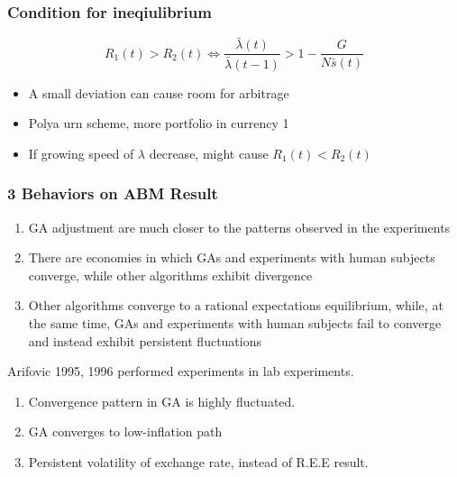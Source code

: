 \begin{frame}
    \frametitle{Condition for ineqiulibrium}

    \begin{equation*}
        R_1(t) > R_2(t) \iff \frac{\bar{\lambda}(t)}{\bar{\lambda}(t-1)} > 1 - \frac{G}{N\bar{s}(t)}
    \end{equation*}
    \begin{itemize}
        \item A small deviation can cause room for arbitrage 
        \item Polya urn scheme, more portfolio in currency 1
        \item If growing speed of $\lambda$ decrease, might cause  $R_1(t) < R_2(t)$ 
    \end{itemize}

    

\end{frame}

\begin{frame}
    \frametitle{3 Behaviors on ABM Result}

    \begin{enumerate}
        \item GA adjustment are much closer to the patterns observed in the experiments 
        \item There are economies in which GAs and experiments with human subjects converge, 
                while other algorithms exhibit divergence
        \item Other algorithms converge to a rational expectations equilibrium, while, 
            at the same time, GAs and experiments with human subjects 
            fail to converge and instead exhibit persistent fluctuations
    \end{enumerate}

    Arifovic 1995, 1996 performed experiments in lab experiments.
    

\end{frame}

\begin{frame}
    
    \begin{enumerate}
        \item Convergence pattern in GA is highly fluctuated.
        \item GA converges to low-inflation path
        \item Persistent volatility of exchange rate, instead of R.E.E result.
    \end{enumerate}

    

\end{frame}